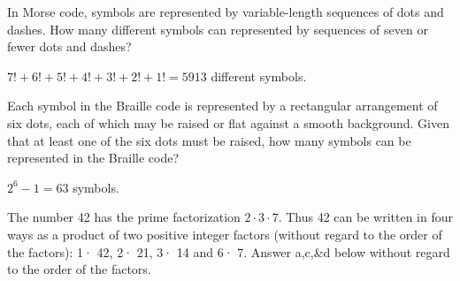 \documentclass[12pt,letterpaper, onecolumn]{exam}
\begin{document}
\begin{questions}
\begin{solution}
	\end{solution}
	\question In Morse code, symbols are represented by variable-length sequences of dots and dashes. How many different symbols can represented by sequences of seven or fewer dots and dashes?
	\begin{solution}
		$7!+6!+5!+4!+3!+2!+1!=5913$ different symbols.
	\end{solution}
	\question Each symbol in the Braille code is represented by a rectangular arrangement of six dots, each of which may be raised or flat against a smooth background. Given that at least one of the six dots must be raised, how many symbols can be represented in the Braille code?
	\begin{solution}
		$2^6-1=63$ symbols.
	\end{solution}
	\setcounter{question}{23}\question The number 42 has the prime factorization $2\cdot3\cdot7$. Thus 42 can be written in four ways as a product of two positive integer factors (without regard to the order of the factors): 1· 42, 2· 21, 3· 14 and 6· 7. Answer a,c,\&d below without regard to the order of the factors.
	\begin{solution}
		\begin{parts}

\end{parts}
\end{solution}
\end{questions}
\end{document}
